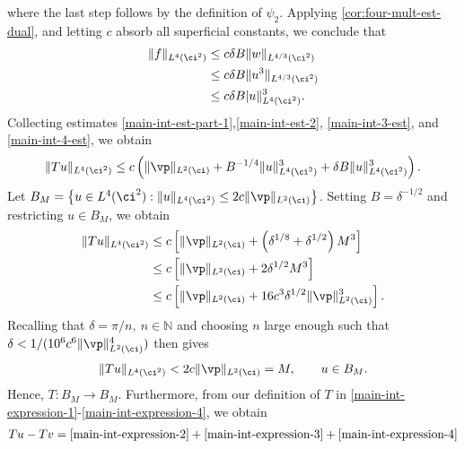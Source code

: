 %
%
where the last step follows by the definition of 
$\psi_2$. 
Applying \cref{cor:four-mult-est-dual}, and letting $c$ absorb all 
superficial constants, we conclude
that 
%
%
\begin{equation}
	\label{main-int-4-est}
	\begin{split}
		\|f\|_{L^4(\ci^2)}
		& \le c \delta B \|w\|_{L^{4/3}(\ci^2)}
		\\
		& \le c \delta B \|u^3\|_{L^{4/3}(\ci^2)}
		\\
		& \le c \delta B |u\|_{L^4(\ci^2)}^3.
	\end{split}
\end{equation}
%
%
Collecting estimates \eqref{main-int-est-part-1},\eqref{main-int-est-2}, 
\eqref{main-int-3-est}, and \eqref{main-int-4-est}, we obtain
%
%
\begin{equation}
	\label{1gh}
	\begin{split}
		\|Tu\|_{L^4(\ci^2)} \le c\left( \|\vp\|_{L^2(\ci)}
		+ B^{-1/4} \|u\|_{L^4(\ci^2)}^3 + \delta B \|u\|_{L^4(\ci^2)}^3 \right).
	\end{split}
\end{equation}
%
%
Let $B_M = \left\{ u \in L^4(\ci^2): \|u\|_{L^4(\ci^2)} \le 2c \|\vp 
\|_{L^2(\ci)} \right\}$. Setting $B = \delta^{-1/2}$ and restricting $u \in B_M$, we 
obtain %
%
\begin{equation*}
	\begin{split}
		\|Tu\|_{L^4(\ci^2)}
		& \le c \left[ \|\vp\|_{L^2(\ci)} + \left( \delta^{1/8} 
		+ \delta^{1/2} \right) M^3 \right]
		\\
		& \le c \left[ \|\vp\|_{L^2(\ci)} + 2 \delta^{1/2} M^3 \right]
		\\
		& \le c \left[ \|\vp\|_{L^2(\ci)} + 16c^3 \delta^{1/2} \|\vp\|_{L^2(\ci)}^3 
		\right].
	\end{split}
\end{equation*}
%
Recalling that  $\delta = \pi/n, \ n \in \mathbb{N}$ and choosing $n$ large enough 
such that $\delta < 1/(10^6 c^6 \|\vp\|_{L^2(\ci)}^4)$ then gives
%
%
\begin{equation}
	\label{ball-to-ball}
	\begin{split}
		\|Tu\|_{L^4(\ci^2)} < 2c\|\vp\|_{L^2(\ci)} = M, \qquad u \in B_M.
	\end{split}
\end{equation}
%
%
Hence, $T: B_M \to B_M$. Furthermore, from our definition of $T$ in 
\eqref{main-int-expression-1}-\eqref{main-int-expression-4}, we obtain
%
%
\begin{equation*}
	\begin{split}
		Tu - Tv = \eqref{main-int-expression-2} + 
		\eqref{main-int-expression-3} + \eqref{main-int-expression-4}
	\end{split}
\end{equation*}
